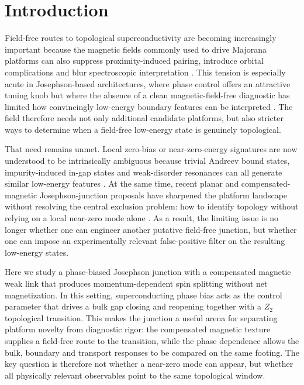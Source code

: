 \documentclass[11pt]{article}
\begin{document}
\section{Introduction}

Field-free routes to topological superconductivity are becoming increasingly important because the magnetic fields commonly used to drive Majorana platforms can also suppress proximity-induced pairing, introduce orbital complications and blur spectroscopic interpretation \cite{fieldfree-tsc-review,majorana-platform-review}. This tension is especially acute in Josephson-based architectures, where phase control offers an attractive tuning knob but where the absence of a clean magnetic-field-free diagnostic has limited how convincingly low-energy boundary features can be interpreted \cite{phase-biased-jj-majorana-review}. The field therefore needs not only additional candidate platforms, but also stricter ways to determine when a field-free low-energy state is genuinely topological.

That need remains unmet. Local zero-bias or near-zero-energy signatures are now understood to be intrinsically ambiguous because trivial Andreev bound states, impurity-induced in-gap states and weak-disorder resonances can all generate similar low-energy features \cite{local-zbp-ambiguity-review,abs-false-positive-review,disorder-false-positive-review}. At the same time, recent planar and compensated-magnetic Josephson-junction proposals have sharpened the platform landscape without resolving the central exclusion problem: how to identify topology without relying on a local near-zero mode alone \cite{planar-jj-topological-sc,compensated-magnetic-jj-tajj-2026}. As a result, the limiting issue is no longer whether one can engineer another putative field-free junction, but whether one can impose an experimentally relevant false-positive filter on the resulting low-energy states.

Here we study a phase-biased Josephson junction with a compensated magnetic weak link that produces momentum-dependent spin splitting without net magnetization. In this setting, superconducting phase bias acts as the control parameter that drives a bulk gap closing and reopening together with a $Z_2$ topological transition. This makes the junction a useful arena for separating platform novelty from diagnostic rigor: the compensated magnetic texture supplies a field-free route to the transition, while the phase dependence allows the bulk, boundary and transport responses to be compared on the same footing. The key question is therefore not whether a near-zero mode can appear, but whether all physically relevant observables point to the same topological window.
\end{document}
